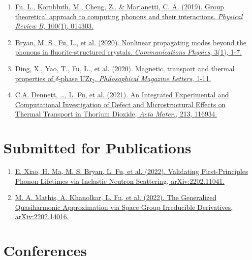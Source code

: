 \documentclass[
  a4paper,
  12pt
]{cv}
\begin{document}
\begin{enumerate}
\item
\href{https://doi.org/10.1103/PhysRevB.100.014303}
{\underline{Fu, L.}, Kornbluth, M., Cheng, Z., \& Marianetti, C. A. (2019). 
Group theoretical approach to computing phonons and their interactions. 
\textit{Physical Review B}, 100(1), 014303.}
%
\item
\href{https://doi.org/10.1038/s42005-020-00483-2}{
Bryan, M. S., \underline{Fu, L.}, et al. (2020). 
Nonlinear propagating modes beyond the phonons in fluorite-structured crystals.
\textit{Communications Physics}, 3(1), 1-7.}
%
\item
\href{https://doi.org/10.1080/09500839.2020.1833375}{
Ding, X., Yao, T., \underline{Fu, L.}, et al. (2020).
Magnetic, transport and thermal properties of $\delta$-phase UZr$_{2}$.
\textit{Philosophical Magazine Letters}, 1-11.
}
%
\item
\href{https://doi.org/10.1016/j.actamat.2021.116934}{
C.A. Dennett, \dots, \underline{L. Fu}, et al. (2021).
An Integrated Experimental and Computational Investigation of Defect and Microstructural Effects on Thermal Transport in Thorium Dioxide, %
\textit{Acta Mater.}, 213, 116934.
}
%
\end{enumerate}


\section{Submitted for Publications}

\begin{enumerate}
\item
\href{https://arxiv.org/abs/2202.11041}{
E. Xiao, H. Ma, M. S. Bryan, \underline{L. Fu}, et al. (2022).
Validating First-Principles Phonon Lifetimes via Inelastic Neutron Scattering,
arXiv:2202.11041.
}

\item
\href{https://arxiv.org/abs/2202.14016}{
M. A. Mathis, A. Khanolkar, \underline{L. Fu}, et al. (2022).
The Generalized Quasiharmonic Approximation via Space Group Irreducible Derivatives,
arXiv:2202.14016.
}
\end{enumerate}


\section{Conferences}
\end{document}
